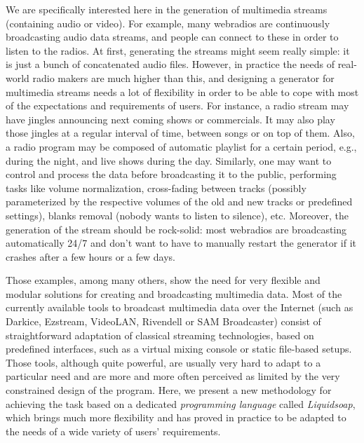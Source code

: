 \documentclass{llncs}
\newcommand{\eg}{{e.g.,}}
\newcommand{\TODO}[1]{\marginpar{\tiny #1}}
\begin{document}
We are specifically interested here in the generation of multimedia streams
(containing audio or video). For example, many webradios are continuously
broadcasting audio data streams, and people can connect to these in order to
listen to the radios. At first, generating the streams might seem really simple:
it is just a bunch of concatenated audio files. However, in practice the needs
of real-world radio makers are much higher than this, and designing a generator
for multimedia streams needs a lot of flexibility in order to be able to cope
with most of the expectations and requirements of users. For instance, a radio
stream may have jingles announcing next coming shows or commercials. It may also
play those jingles at a regular interval of time, between songs or on top of
them. Also, a radio program may be composed of automatic playlist for a certain
period, \eg{} during the night, and live shows during the day. Similarly, one
may want to control and process the data before broadcasting it to the public,
performing tasks like volume normalization, cross-fading between tracks
(possibly parameterized by the respective volumes of the old and new tracks or
predefined settings), blanks removal (nobody wants to listen to silence),
etc. Moreover, the generation of the stream should be rock-solid: most webradios
are broadcasting automatically 24/7 and don't want to have to manually restart
the generator if it crashes after a few hours or a few days.

Those examples, among many others, show the need for very flexible and modular
solutions for creating and broadcasting multimedia data. Most of the currently
available tools to broadcast multimedia data over the Internet (such as Darkice,
Ezstream, VideoLAN, Rivendell or SAM Broadcaster) consist of straightforward
adaptation of classical streaming technologies, based on
predefined interfaces, such as a virtual mixing console or static file-based
setups. Those tools, although quite powerful, are usually very hard to adapt to
a particular need and are more and more often perceived as limited by the very
\TODO{DB "new" c'est abusé}
constrained design of the program. Here, we present a new methodology for
achieving the task based on a dedicated \emph{programming language} called
\emph{Liquidsoap}, which brings much more flexibility and has proved in practice
to be adapted to the needs of a wide variety of users' requirements.
\end{document}
